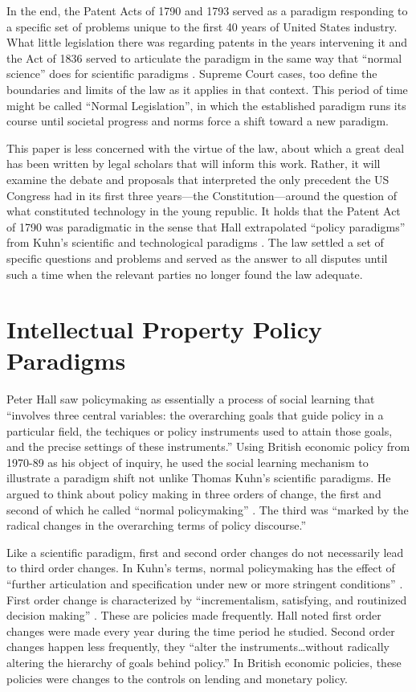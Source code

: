 \documentclass[pdftex,11pt,letterpaper]{article}
\begin{document}
In the end, the Patent Acts of 1790 and 1793 served as a paradigm responding to a specific set of problems unique to the first 40 years of United States industry. What little legislation there was regarding patents in the years intervening it and the Act of 1836 served to articulate the paradigm in the same way that ``normal science'' does for scientific paradigms \autocite{Kuhn1970}. Supreme Court cases, too define the boundaries and limits of the law as it applies in that context. This period of time might be called ``Normal Legislation'', in which the established paradigm runs its course until societal progress and norms force a shift toward a new paradigm.

This paper is less concerned with the virtue of the law, about which a great deal has been written by legal scholars that will inform this work. Rather, it will examine the debate and proposals that interpreted the only precedent the US Congress had in its first three years---the Constitution---around the question of what constituted technology in the young republic. It holds that the Patent Act of 1790 was paradigmatic in the sense that Hall extrapolated ``policy paradigms'' from Kuhn's scientific and technological paradigms \autocite{Hall1993, Kuhn1970}. The law settled a set of specific questions and problems and served as the answer to all disputes until such a time when the relevant parties no longer found the law adequate.


\section{Intellectual Property Policy Paradigms}

Peter Hall saw policymaking as essentially a process of social learning that ``involves three central variables: the overarching goals that guide policy in a particular field, the techiques or policy instruments used to attain those goals, and the precise settings of these instruments.'' Using British economic policy from 1970-89 as his object of inquiry, he used the social learning mechanism to illustrate a paradigm shift not unlike Thomas Kuhn's scientific paradigms. He argued to think about policy making in three orders of change, the first and second of which he called ``normal policymaking'' \autocite{Hall1993}. The third was ``marked by the radical changes in the overarching terms of policy discourse.'' 

Like a scientific paradigm, first and second order changes do not necessarily lead to third order changes. In Kuhn's terms, normal policymaking has the effect of ``further articulation and specification under new or more stringent conditions'' \autocite{Kuhn1970}. First order change is characterized by ``incrementalism, satisfying, and routinized decision making'' \autocite{Hall1993}. These are policies made frequently. Hall noted first order changes were made every year during the time period he studied.  Second order changes happen less frequently, they ``alter the instruments\ldots without radically altering the hierarchy of goals behind policy.'' In British economic policies, these policies were changes to the controls on lending and monetary policy.
\end{document}
